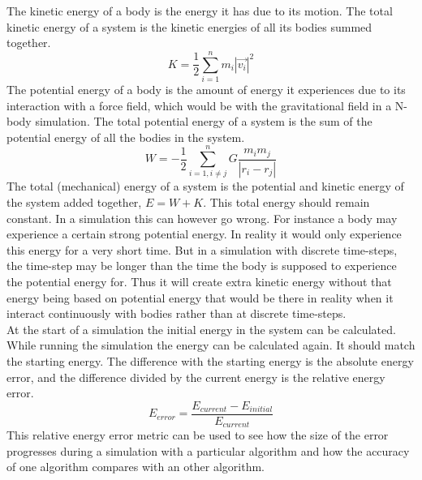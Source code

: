 \documentclass[11pt]{article} %
\begin{document}
The kinetic energy of a body is the energy it has due to its motion. The total kinetic energy of a system is the kinetic energies of all its bodies summed together.
\begin{equation}
    K = \frac{1}{2} \sum_{i=1}^n m_i |\vec{v_i}|^2
\end{equation}
The potential energy of a body is the amount of energy it experiences due to its interaction with a force field, which would be with the gravitational field in a N-body simulation. The total potential energy of a system is the sum of the potential energy of all the bodies in the system.
\begin{equation}
    W = -\frac{1}{2} \sum_{i=1, i \neq j}^n G \frac{m_i m_j}{|r_i - r_j|}
\end{equation}
The total (mechanical) energy of a system is the potential and kinetic energy of the system added together, $E = W+K$. This total energy should remain constant. In a simulation this can however go wrong. For instance a body may experience a certain strong potential energy. In reality it would only experience this energy for a very short time. But in a simulation with discrete time-steps, the time-step may be longer than the time the body is supposed to experience the potential energy for. Thus it will create extra kinetic energy without that energy being based on potential energy that would be there in reality when it interact continuously with bodies rather than at discrete time-steps. \\
At the start of a simulation the initial energy in the system can be calculated. While running the simulation the energy can be calculated again. It should match the starting energy. The difference with the starting energy is the absolute energy error, and the difference divided by the current energy is the relative energy error.
\begin{equation}
    \label{eq:energyerror}
    E_{error} = \frac{E_{current} - E_{initial}}{E_{current}}
\end{equation}
This relative energy error metric can be used to see how the size of the error progresses during a simulation with a particular algorithm and how the accuracy of one algorithm compares with an other algorithm.
\end{document}
